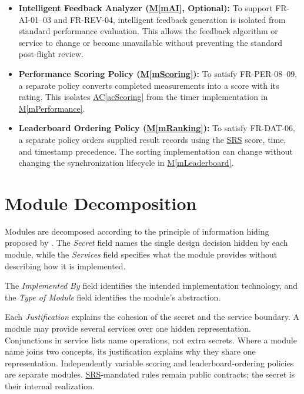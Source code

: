 \documentclass[12pt, titlepage]{article}
\DeclareRobustCommand{\mgabbr}[2]{\hyperlink{mg-abbr:#1}{#2}}
\newcommand{\acref}[1]{\mgabbr{ac}{AC}\ref{#1}}
\newcommand{\mref}[1]{\hyperref[#1]{M\ref*{#1}}}
\begin{document}
\begin{itemize}
    \item \textbf{Intelligent Feedback Analyzer (\mref{mAI},
    Optional):}
    To support FR-AI-01--03 and FR-REV-04, intelligent
    feedback generation is isolated from standard performance
    evaluation. This allows the feedback algorithm or service
    to change or become unavailable without preventing the
    standard post-flight review.

    \item \textbf{Performance Scoring Policy (\mref{mScoring}):}
    To satisfy FR-PER-08--09, a separate policy converts completed
    measurements into a score with its rating. This isolates
    \acref{acScoring} from the timer implementation in \mref{mPerformance}.

    \item \textbf{Leaderboard Ordering Policy (\mref{mRanking}):}
    To satisfy FR-DAT-06, a separate policy orders supplied result records
    using the \mgabbr{srs}{SRS} score, time, and timestamp precedence. The
    sorting
    implementation can change without changing the synchronization
    lifecycle in \mref{mLeaderboard}.

\end{itemize}



\section{Module Decomposition} \label{SecMD}

Modules are decomposed according to the principle of information
hiding proposed by \citet{ParnasEtAl1984}. The \emph{Secret}
field names the single design decision hidden by each module,
while the \emph{Services} field specifies what the module
provides without describing how it is implemented.

The \emph{Implemented By} field identifies the intended
implementation technology, and the \emph{Type of Module}
field identifies the module's abstraction.

Each \emph{Justification} explains the cohesion of the secret and the
service boundary. A module may provide several services over one hidden
representation. Conjunctions in service lists name operations, not extra
secrets. Where a module name joins two concepts, its justification explains
why they share one representation. Independently variable scoring and
leaderboard-ordering policies are separate modules. \mgabbr{srs}{SRS}-mandated
rules
remain public contracts; the secret is their internal realization.
\end{document}
